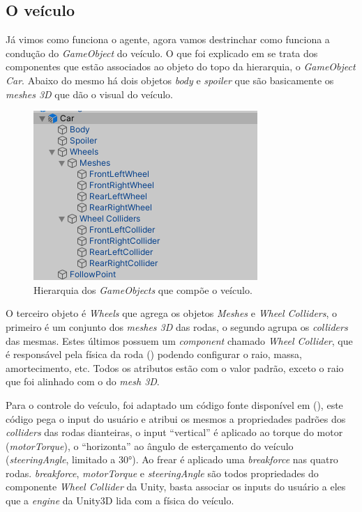 \subsection{O veículo}
Já vimos como funciona o agente, agora vamos destrinchar como funciona a condução do \textit{GameObject} do veículo. O que foi explicado em  se trata dos componentes que estão associados ao objeto do topo da hierarquia, o \textit{GameObject Car}. Abaixo do mesmo há dois objetos \textit{body} e \textit{spoiler} que são basicamente os \textit{meshes 3D} que dão o visual do veículo.

\begin{figure}[h]
   \centering
   \includegraphics{figs/hierarquia-veiculo.png}
    \caption{Hierarquia dos \textit{GameObjects} que compõe o veículo.}
    \label{fig:vehicle-hierarchy}
\end{figure}

O terceiro objeto é \textit{Wheels} que agrega os objetos \textit{Meshes} e \textit{Wheel Colliders}, o primeiro é um conjunto dos \textit{meshes 3D} das rodas, o segundo agrupa os \textit{colliders} das mesmas. Estes últimos possuem um \textit{component} chamado \textit{Wheel Collider}, que é responsável pela física da roda () podendo configurar o raio, massa, amortecimento, etc. Todos os atributos estão com o valor padrão, exceto o raio que foi alinhado com o do \textit{mesh 3D}.

Para o controle do veículo, foi adaptado um código fonte disponível em (), este código pega o input do usuário e atribui os mesmos a propriedades padrões dos \textit{colliders} das rodas dianteiras, o input ``vertical'' é aplicado ao torque do motor (\textit{motorTorque}), o ``horizonta'' ao ângulo de esterçamento do veículo (\textit{steeringAngle}, limitado a 30°). Ao frear é aplicado uma \textit{breakforce} nas quatro rodas. \textit{breakforce}, \textit{motorTorque} e \textit{steeringAngle} são todos propriedades do componente \textit{Wheel Collider} da Unity, basta associar os inputs do usuário a eles que a \textit{engine} da Unity3D lida com a física do veículo.

